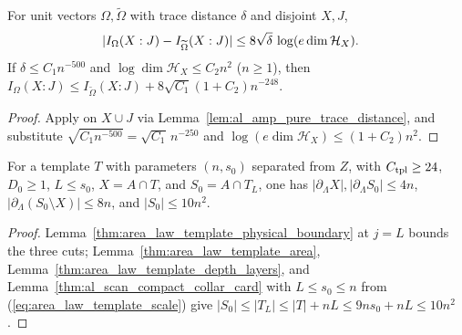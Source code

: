 \begin{lemma}
    \label{thm:area_law_collar_transfer}
    \leanok
    For unit vectors $\Omega,\widetilde\Omega$ with trace distance $\delta$ and
    disjoint $X,J$,
    \begin{align}
        |I_\Omega(X:J)-I_{\widetilde\Omega}(X:J)|
         & \le8\sqrt\delta\,\log(e\dim\mathcal H_X).\notag
    \end{align}
    If $\delta\le C_1n^{-500}$ and $\log\dim\mathcal H_X\le C_2n^2$ ($n\ge1$),
    then $I_\Omega(X:J)\le I_{\widetilde\Omega}(X:J)+8\sqrt{C_1}(1+C_2)n^{-248}$.
\end{lemma}
\begin{proof}
    \leanok
    Apply \cite[Lemma~2.1]{OpenAI2026AreaLaw} on $X\cup J$ via
    Lemma~\ref{lem:al_amp_pure_trace_distance}, and substitute
    $\sqrt{C_1n^{-500}}=\sqrt{C_1}\,n^{-250}$ and
    $\log(e\dim\mathcal H_X)\le(1+C_2)n^2$.
\end{proof}

\begin{lemma}
    \label{thm:area_law_collar_cut_bounds}
    \leanok
    For a template $T$ with parameters $(n,s_0)$ separated from $Z$, with
    $C_{\rm tpl}\ge24$, $D_0\ge1$, $L\le s_0$, $X=A\cap T$, and $S_0=A\cap T_L$,
    one has $|\partial_\Lambda X|,|\partial_\Lambda S_0|\le4n$,
    $|\partial_\Lambda(S_0\setminus X)|\le8n$, and $|S_0|\le10n^2$.
\end{lemma}
\begin{proof}
    \leanok
    Lemma~\ref{thm:area_law_template_physical_boundary} at $j=L$ bounds the
    three cuts; Lemma~\ref{thm:area_law_template_area},
    Lemma~\ref{thm:area_law_template_depth_layers}, and
    Lemma~\ref{thm:al_scan_compact_collar_card} with $L\le s_0\le n$ from
    (\ref{eq:area_law_template_scale}) give
    $|S_0|\le|T_L|\le|T|+nL\le9ns_0+nL\le10n^2$.
\end{proof}

